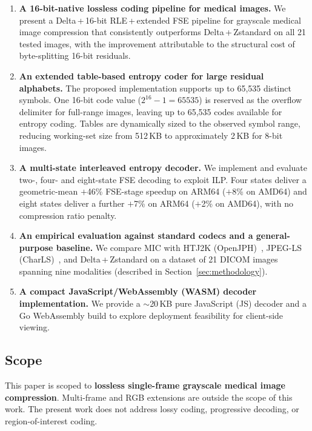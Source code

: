 \documentclass[journal]{IEEEtran}
\begin{document}
\begin{enumerate}
  \item \textbf{A 16-bit-native lossless coding pipeline for medical images.}
  We present a Delta\,+\,16-bit RLE\,+\,extended FSE pipeline for grayscale
  medical image compression that consistently outperforms Delta\,+\,Zstandard
  on all 21 tested images, with the improvement attributable to the structural
  cost of byte-splitting 16-bit residuals.

  \item \textbf{An extended table-based entropy coder for large residual
  alphabets.}
  The proposed implementation supports up to 65,535 distinct symbols.
  One 16-bit code value ($2^{16}-1 = 65535$) is reserved as the overflow
  delimiter for full-range images, leaving up to 65,535 codes available for
  entropy coding. Tables are dynamically sized to the observed symbol range,
  reducing working-set size from 512\,KB to approximately 2\,KB for 8-bit
  images.

  \item \textbf{A multi-state interleaved entropy decoder.}
  We implement and evaluate two-, four- and eight-state FSE decoding to
  exploit ILP. Four states deliver a geometric-mean $+$46\% FSE-stage
  speedup on ARM64 ($+$8\% on AMD64) and eight states deliver a further
  $+$7\% on ARM64 ($+$2\% on AMD64), with no compression ratio penalty.

  \item \textbf{An empirical evaluation against standard codecs and a
  general-purpose baseline.}
  We compare MIC with HTJ2K (OpenJPH)~\cite{openjph}, JPEG-LS
  (CharLS)~\cite{charls}, and Delta\,+\,Zstandard on a dataset of 21
  DICOM images spanning nine modalities (described in
  Section~\ref{sec:methodology}).

  \item \textbf{A compact JavaScript/WebAssembly (WASM) decoder implementation.}
  We provide a ${\sim}$20\,KB pure JavaScript (JS) decoder and a Go
  WebAssembly build to explore deployment feasibility for client-side viewing.
\end{enumerate}

\subsection{Scope}

This paper is scoped to \textbf{lossless single-frame grayscale medical image
compression}. Multi-frame and RGB extensions are outside the scope of this
work. The present work does not address lossy coding, progressive decoding, or
region-of-interest coding.
\end{document}
